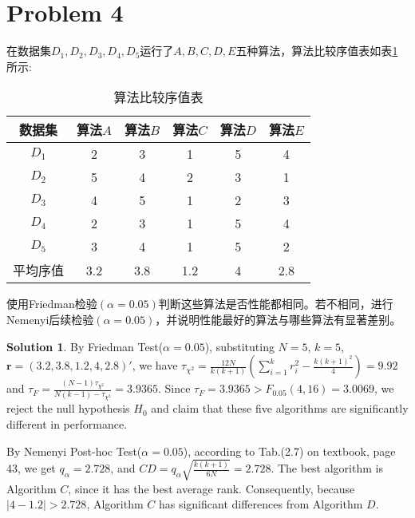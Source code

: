 \documentclass[a4paper,UTF8]{article}
\theoremstyle{definition}
\newtheorem*{solution}{Solution}
\begin{document}
\section*{Problem 4} 
在数据集$D_1,D_2,D_3,D_4,D_5$运行了$A,B,C,D,E$五种算法，算法比较序值表如表\ref{table:ranking}所示:
\begin{table}[h]
\centering
\caption{算法比较序值表} \vspace{2mm}\label{table:ranking}
\begin{tabular}{c|c c c c c}\hline
数据集 & 算法$A$ & 算法$B$  & 算法$C$  &算法$D$  &算法$E$ \\
\hline
$D_1$ & 2  & 3 &  1 &  5  & 4\\
$D_2$ & 5  & 4 &  2 &  3  & 1\\
$D_3$ & 4  & 5 &  1 &  2  & 3\\
$D_4$ & 2  & 3 &  1 &  5  & 4\\
$D_5$ & 3  & 4 &  1 &  5  & 2\\
\hline
平均序值 & 3.2 &  3.8 & 1.2 &  4 &  2.8 \\
\hline
\end{tabular}
\end{table}

使用Friedman检验$(\alpha=0.05)$判断这些算法是否性能都相同。若不相同，进行Nemenyi后续检验$(\alpha=0.05)$，并说明性能最好的算法与哪些算法有显著差别。
\begin{solution}
By Friedman Test($\alpha=0.05$), substituting $N=5$, $k=5$, $\bm{r}=(3.2, 3.8, 1.2, 4, 2.8)'$, we have $\tau_{\chi^2}=\frac{12N}{k(k+1)}\left(\sum_{i=1}^kr_i^2-\frac{k(k+1)^2}{4}\right)=9.92$ and $\tau_F=\frac{(N-1)\tau_{\chi^2}}{N(k-1)-\tau_{\chi^2}}=3.9365$. Since $\tau_F=3.9365>F_{0.05}(4, 16)=3.0069$, we reject the null hypothesis $H_0$ and claim that these five algorithms are significantly different in performance.

By Nemenyi Post-hoc Test($\alpha=0.05$), according to Tab.(2.7) on textbook, page 43, we get $q_\alpha=2.728$, and $CD=q_\alpha\sqrt{\frac{k(k+1)}{6N}}=2.728$. The best algorithm is Algorithm $C$, since it has the best average rank. Consequently, because $|4-1.2|>2.728$, Algorithm $C$ has significant differences from Algorithm $D$.

~\\
~\\
\end{solution}
\end{document}
